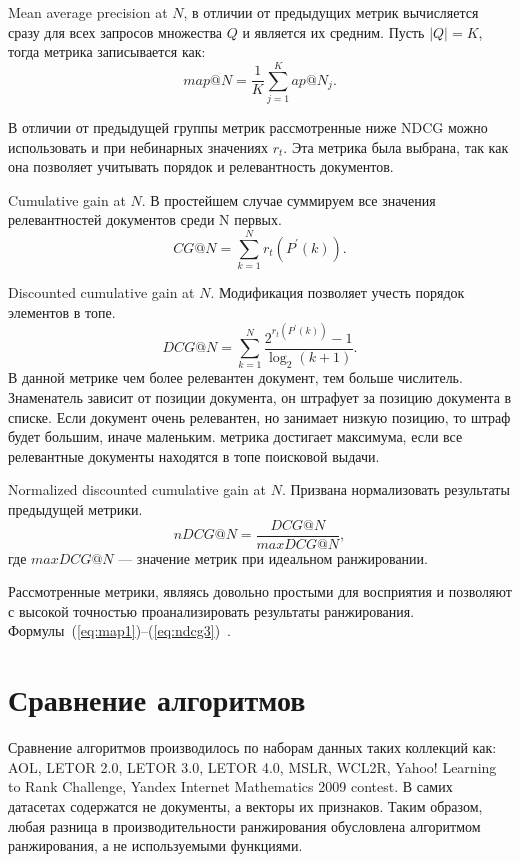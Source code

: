 Mean average precision at $N$, в отличии от предыдущих метрик вычисляется сразу для всех запросов множества $Q$ и является их средним. Пусть $|Q| = K$, тогда метрика записывается как:
\begin{equation}
	\label{eq:map3}
	map @ N=\frac{1}{K} \sum_{j=1}^K ap @ N_j.
\end{equation}

В отличии от предыдущей группы метрик рассмотренные ниже NDCG можно использовать и при небинарных значениях $r_t$. Эта метрика была выбрана, так как она позволяет учитывать порядок и релевантность документов.

Cumulative gain at $N$. В простейшем случае суммируем все значения релевантностей документов среди N первых.
\begin{equation}
	\label{eq:ndcg1}
	CG @ N= \sum_{k=1}^N r_t(P^{\prime}(k)).
\end{equation}

Discounted cumulative gain at $N$. Модификация позволяет учесть порядок элементов в топе.
\begin{equation}
	\label{eq:ndcg2}
	D C G @ N=\sum_{k=1}^N \frac{2^{r_t(P^{\prime}(k))}-1}{\log _2(k+1)}.
\end{equation}
В данной метрике чем более релевантен документ, тем больше числитель. Знаменатель зависит от позиции документа, он штрафует за позицию документа в списке. Если документ очень релевантен, но занимает низкую позицию, то штраф будет большим, иначе маленьким. метрика достигает максимума, если все релевантные документы находятся в топе поисковой выдачи.

Normalized discounted cumulative gain at $N$. Призвана нормализовать результаты предыдущей метрики.
\begin{equation}
	\label{eq:ndcg3}
	nD C G @ N=\frac{D C G @ N}{maxD C G @ N},
\end{equation}
где $maxD C G @ N$ --- значение метрик при идеальном ранжировании.

Рассмотренные метрики, являясь довольно простыми для восприятия и позволяют с высокой точностью проанализировать результаты ранжирования. Формулы~(\ref{eq:map1})--(\ref{eq:ndcg3})~\cite{metrics}.

\section{Сравнение алгоритмов}

Сравнение алгоритмов производилось по наборам данных таких коллекций как: AOL, LETOR 2.0, LETOR 3.0, LETOR 4.0, MSLR, WCL2R, Yahoo! Learning to Rank Challenge, Yandex Internet Mathematics 2009 contest. В самих датасетах содержатся не документы, а векторы их признаков. Таким образом, любая разница в производительности ранжирования обусловлена алгоритмом ранжирования, а не используемыми функциями.

